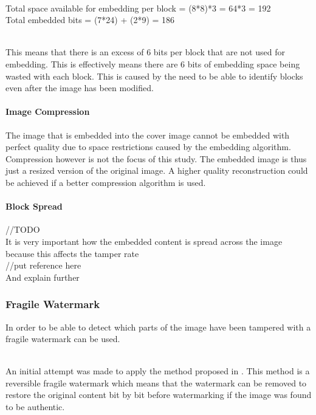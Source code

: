 \documentclass[11pt]{article}
\begin{document}
\hspace{0pt} \\
Total space available for embedding per block = (8*8)*3 = 64*3 = 192
\hspace{0pt} \\
Total embedded bits = (7*24) + (2*9) = 186

\hspace{0pt} \\
This means that there is an excess of 6 bits per block that are not used for embedding. This is effectively means there are 6 bits of embedding space being wasted with each block.
This is caused by the need to be able to identify blocks even after the image has been modified. 

\paragraph{Image Compression}
\label{ImageCompression}
The image that is embedded into the cover image cannot be embedded with perfect quality due to space restrictions caused by the embedding algorithm. 
Compression however is not the focus of this study.
The embedded image is thus just a resized version of the original image.
A higher quality reconstruction could be achieved if a better compression algorithm is used.

\paragraph{Block Spread}
//TODO
\hspace{0pt} \\
It is very important how the embedded content is spread across the image because this affects the tamper rate
\hspace{0pt} \\
//put reference here
\hspace{0pt} \\
And explain further

\subsubsection{Fragile Watermark}
\label{impFragileWatermark}
In order to be able to detect which parts of the image have been tampered with a fragile watermark can be used.

\hspace{0pt} \\
An initial attempt was made to apply the method proposed in \cite{tian2002wavelet}.
This method is a reversible fragile watermark which means that the watermark can be removed to restore the original content bit by bit before watermarking if the image was found to be authentic.
\end{document}
